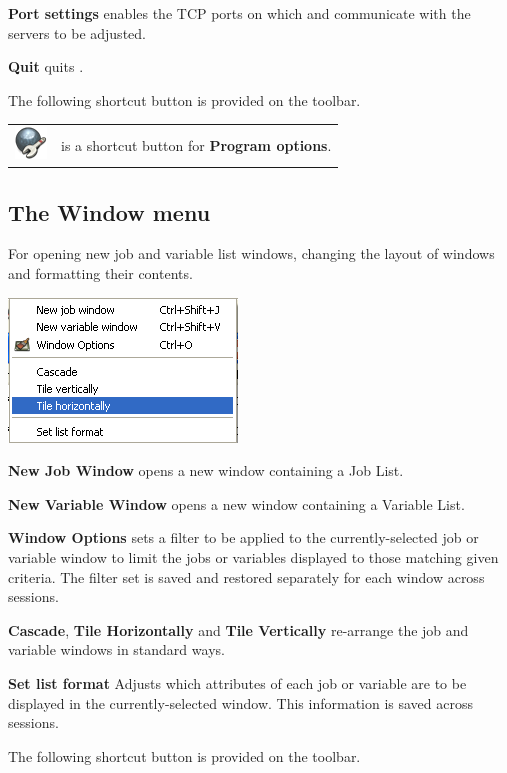 \textbf{Port settings} enables the TCP ports on which  and
 communicate with the servers to be adjusted.

\textbf{Quit} quits .

The following shortcut button is provided on the toolbar.

\begin{tabular}{l p{12cm}}
\includegraphics{img/btqwprogopts.png} & is a shortcut button for \textbf{Program options}.\\
\end{tabular}

\subsection{The Window menu}
For opening new job and variable list windows, changing the layout of
windows and formatting their contents.

\includegraphics{img/btqwwinmenu.png} 

\textbf{New Job Window} opens a new window containing a Job List.

\textbf{New Variable Window} opens a new window containing a Variable
List.

\textbf{Window Options} sets a filter to be applied to the currently-selected job
or variable window to limit the jobs or variables displayed to those matching
given criteria. The filter set is saved and restored separately for each window
across  sessions.

\textbf{Cascade}, \textbf{Tile Horizontally} and \textbf{Tile Vertically} re-arrange the job and variable windows
in standard ways.

\textbf{Set list format} Adjusts which attributes of each job or variable are to be displayed in the
currently-selected window. This information is saved across  sessions.

The following shortcut button is provided on the toolbar.

